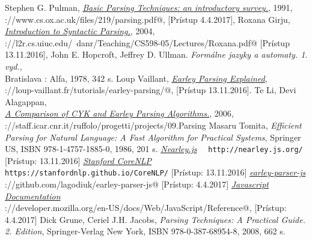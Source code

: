 \documentclass[12pt,a4paper]{report}
\theoremstyle{definition}
\theoremstyle{remark}
\begin{document}
\renewcommand\bibname{Literatúra}
\begin{thebibliography}{99}
Stephen G. Pulman, \emph{\href{https://www.cs.ox.ac.uk/files/219/parsing.pdf}{Basic Parsing Techniques: an introductory survey.}}, 1991, \\ \verb@https://www.cs.ox.ac.uk/files/219/parsing.pdf@, [Prístup 4.4.2017],
Roxana Girju, \emph{\href{http://l2r.cs.uiuc.edu/~danr/Teaching/CS598-05/Lectures/Roxana.pdf}{Introduction to Syntactic Parsing.}}, 2004, \\ \verb@http://l2r.cs.uiuc.edu/~danr/Teaching/CS598-05/Lectures/Roxana.pdf@ [Prístup 13.11.2016],
John E. Hopcroft, Jeffrey D. Ullman. \emph{Formálne jazyky a automaty. 1. vyd.}, \\ Bratislava : Alfa, 1978, 342 s.
Loup Vaillant, \emph{\href{http://loup-vaillant.fr/tutorials/earley-parsing/}{Earley Parsing Explained}}, \\ \verb@http://loup-vaillant.fr/tutorials/earley-parsing/@, [Prístup 13.11.2016].
Te Li, Devi Alagappan, \\
\emph{\href{http://staff.icar.cnr.it/ruffolo/progetti/projects/09.Parsing\%20CYK/A\%20Comparison\%20of\%20CYK\%20and\%20Earley\%20Parsing\%20Algorithms-cykeReport.pdf}{A Comparison of CYK and Earley Parsing Algorithms.}}, 2006, \\ \verb@http://staff.icar.cnr.it/ruffolo/progetti/projects/09.Parsing\@
\verb@%20CYK/A\%20Comparison\%20of\%20CYK\%20and\%20Earley\%20Parsing\@
\verb@%20Algorithms-cykeReport.pdf@ [Prístup 18.11.2016],
Masaru Tomita, \emph{Efficient Parsing for Natural Language: A Fast Algorithm for Practical Systems}, Springer US, ISBN 978-1-4757-1885-0, 1986, 201 s.
\emph{\href{http://nearley.js.org/}{Nearley.js}} \ \ \verb!http://nearley.js.org/! [Prístup: 13.11.2016]
\emph{\href{https://stanfordnlp.github.io/CoreNLP/}{Stanford CoreNLP}} \\ \verb!https://stanfordnlp.github.io/CoreNLP/! [Prístup: 13.11.2016]
\emph{\href{https://github.com/lagodiuk/earley-parser-js}{earley-parser-js}}  \\
\verb@https://github.com/lagodiuk/earley-parser-js@ [Prístup: 4.4.2017]
\emph{\href{https://developer.mozilla.org/en-US/docs/Web/JavaScript/Reference}{Javascript Documentation}} \\ \verb@https://developer.mozilla.org/en-US/docs/Web/JavaScript/Reference@, [Prístup: 4.4.2017]
Dick Grune, Ceriel J.H. Jacobs, \emph{Parsing Techniques: A Practical Guide. 2. Edition}, Springer-Verlag New York,  ISBN 978-0-387-68954-8, 2008, 662 s.
\end{thebibliography}
\end{document}
